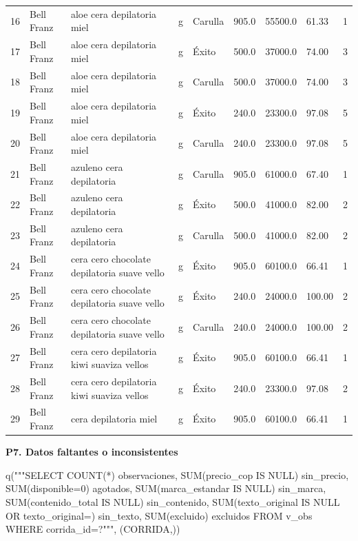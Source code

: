 \documentclass[
  spanish,
  letterpaper,
  DIV=11,
  numbers=noendperiod]{scrartcl}
\newenvironment{Shaded}{\begin{snugshade}}{\end{snugshade}}
\newcommand{\NormalTok}[1]{\textcolor[rgb]{0.00,0.23,0.31}{#1}}
\newcommand{\StringTok}[1]{\textcolor[rgb]{0.13,0.47,0.30}{#1}}
\begin{document}
{\begin{longtable}[]{@{}lllllllll@{}}
16 & Bell Franz & aloe cera depilatoria miel & g & Carulla & 905.0 &
55500.0 & 61.33 & 1 \\
17 & Bell Franz & aloe cera depilatoria miel & g & Éxito & 500.0 &
37000.0 & 74.00 & 3 \\
18 & Bell Franz & aloe cera depilatoria miel & g & Carulla & 500.0 &
37000.0 & 74.00 & 3 \\
19 & Bell Franz & aloe cera depilatoria miel & g & Éxito & 240.0 &
23300.0 & 97.08 & 5 \\
20 & Bell Franz & aloe cera depilatoria miel & g & Carulla & 240.0 &
23300.0 & 97.08 & 5 \\
21 & Bell Franz & azuleno cera depilatoria & g & Carulla & 905.0 &
61000.0 & 67.40 & 1 \\
22 & Bell Franz & azuleno cera depilatoria & g & Éxito & 500.0 & 41000.0
& 82.00 & 2 \\
23 & Bell Franz & azuleno cera depilatoria & g & Carulla & 500.0 &
41000.0 & 82.00 & 2 \\
24 & Bell Franz & cera cero chocolate depilatoria suave vello & g &
Éxito & 905.0 & 60100.0 & 66.41 & 1 \\
25 & Bell Franz & cera cero chocolate depilatoria suave vello & g &
Éxito & 240.0 & 24000.0 & 100.00 & 2 \\
26 & Bell Franz & cera cero chocolate depilatoria suave vello & g &
Carulla & 240.0 & 24000.0 & 100.00 & 2 \\
27 & Bell Franz & cera cero depilatoria kiwi suaviza vellos & g & Éxito
& 905.0 & 60100.0 & 66.41 & 1 \\
28 & Bell Franz & cera cero depilatoria kiwi suaviza vellos & g & Éxito
& 240.0 & 23300.0 & 97.08 & 2 \\
29 & Bell Franz & cera depilatoria miel & g & Éxito & 905.0 & 60100.0 &
66.41 & 1 \\
\end{longtable}
}

\textbf{P7. Datos faltantes o inconsistentes}

\begin{Shaded}
\begin{Highlighting}[]
\NormalTok{q(}\StringTok{"""SELECT COUNT(*) observaciones,}
\StringTok{ SUM(precio\_cop IS NULL) sin\_precio, SUM(disponible=0) agotados,}
\StringTok{ SUM(marca\_estandar IS NULL) sin\_marca, SUM(contenido\_total IS NULL) sin\_contenido,}
\StringTok{ SUM(texto\_original IS NULL OR texto\_original=\textquotesingle{}\textquotesingle{}) sin\_texto, SUM(excluido) excluidos}
\StringTok{FROM v\_obs WHERE corrida\_id=?"""}\NormalTok{, (CORRIDA,))}
\end{Highlighting}
\end{Shaded}
\end{document}
